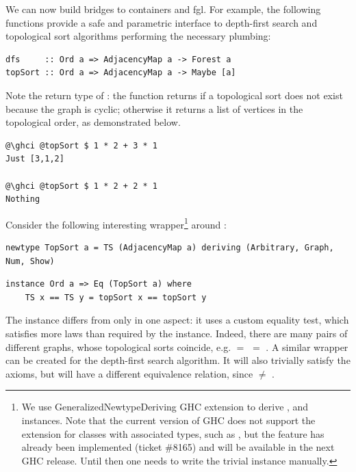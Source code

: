 We can now build bridges to \textsf{containers} and \textsf{fgl}. For example,
the following functions provide a safe and parametric interface to depth-first
search and topological sort algorithms performing the necessary plumbing:

\begin{verbatim}
dfs     :: Ord a => AdjacencyMap a -> Forest a
topSort :: Ord a => AdjacencyMap a -> Maybe [a]
\end{verbatim}

\noindent
Note the return type of : the function returns 
if a topological sort does not exist because the graph is cyclic; otherwise it
returns a list of vertices in the topological order, as demonstrated below.

\begin{verbatim}
@\ghci @topSort $ 1 * 2 + 3 * 1
Just [3,1,2]

@\ghci @topSort $ 1 * 2 + 2 * 1
Nothing
\end{verbatim}

Consider the following interesting
wrapper\footnote{We use \textsf{GeneralizedNewtypeDeriving} GHC
extension to derive ,  and  instances. Note that
the current version of GHC does not support the extension for classes
with associated types, such as , but the feature has already been
implemented (ticket \#8165) and will be available in the next GHC release.
Until then one needs to write the trivial  instance manually.}
around :

\begin{verbatim}
newtype TopSort a = TS (AdjacencyMap a) deriving (Arbitrary, Graph, Num, Show)
\end{verbatim}
\vspace{1mm}
\begin{verbatim}
instance Ord a => Eq (TopSort a) where
    TS x == TS y = topSort x == topSort y
\end{verbatim}

\noindent
The  instance differs from  only in one aspect: it uses
a custom equality test, which satisfies more laws than required by the 
instance. Indeed, there are many pairs of different graphs, whose topological sorts
coincide, e.g.  $=$  $=$ .
A similar  wrapper can be created for the depth-first search
algorithm. It will also trivially satisfy the  axioms, but will have
a different equivalence relation, since  $\neq$ .


